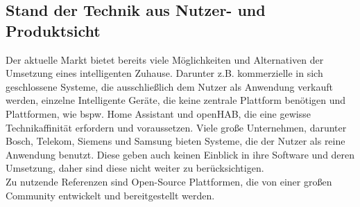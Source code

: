     \subsection{Stand der Technik aus Nutzer- und Produktsicht}
        Der aktuelle Markt bietet bereits viele Möglichkeiten und Alternativen der Umsetzung eines intelligenten Zuhause. 
        Darunter z.B. kommerzielle in sich geschlossene Systeme, die ausschließlich dem Nutzer als Anwendung verkauft werden, 
        einzelne Intelligente Geräte, die keine zentrale Plattform benötigen und Plattformen, wie bspw. Home Assistant 
        und openHAB, die eine gewisse Technikaffinität erfordern und voraussetzen. Viele große Unternehmen, darunter Bosch, 
        Telekom, Siemens und Samsung bieten Systeme, die der Nutzer als reine Anwendung benutzt. Diese geben auch keinen 
        Einblick in ihre Software und deren Umsetzung, daher sind diese nicht weiter zu berücksichtigen. 
        \\
        \linebreak
        Zu nutzende Referenzen sind Open-Source Plattformen, die von einer großen Community entwickelt und bereitgestellt werden. 
